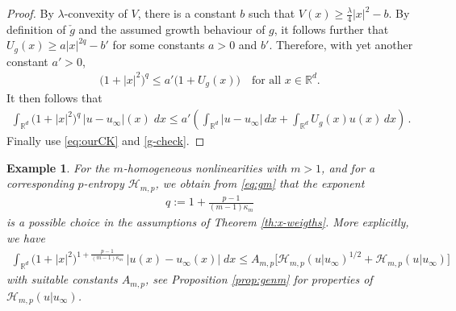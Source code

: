 \documentclass[reqno]{amsart}
\newtheorem{example}[lemma]{Example}
\newcommand{\R}{\mathbb{R}}
\newcommand{\Rd}{{\R^d}}
\newcommand{\uinf}{u_\infty}
\begin{document}
%
\begin{proof}
    By $\lambda$-convexity of $V$, there is a constant $b$ such that $V(x)\ge \frac\lambda4|x|^2-b$. By definition of $\check g$ and the assumed growth behaviour of $g$, it follows further that $U_g(x)\ge a|x|^{2q}-b'$ for some constants $a>0$ and $b'$. Therefore, with yet another constant $a'>0$,
    \begin{align*}
        \big(1+|x|^2\big)^q 
        \le a' \big(1+U_g(x)\big) \quad \text{for all $x\in\Rd$}.
    \end{align*}
    It then follows that
    \begin{align*}
        \int_{\Rd} \big(1+|x|^2)^q \,|u-\uinf|(x)\;dx 
        \le a'\left(\int_{\Rd} |u-u_\infty|\,dx + \int_{\Rd} U_g(x) u(x)\,dx\right)\,.
    \end{align*}
    Finally use \eqref{eq:ourCK} and \eqref{g-check}.
\end{proof}
%
\begin{example}
    For the $m$-homogeneous nonlinearities with $m>1$, and for a corresponding $p$-entropy ${\mathcal H}_{m,p}$, we obtain from \eqref{eq:gm} that the exponent
    \begin{align*}
        q := 1+ \frac{p-1}{(m-1)\kappa_m} 
    \end{align*}
    is a possible choice in the assumptions of Theorem \ref{th:x-weigths}. More explicitly, we have
    \begin{align*}
        \int_{\R^d} \big(1+|x|^2)^{1+\frac{p-1}{(m-1)\kappa_m}} \,|u(x)-\uinf(x)|\;dx \le A_{m,p}\big[\mathcal{H}_{m,p}(u|\uinf)^{1/2}+\mathcal{H}_{m,p}(u|\uinf)\big]
    \end{align*}
    with suitable constants $A_{m,p}$, see  Proposition \ref{prop:genm} for properties of $\mathcal{H}_{m,p}(u|\uinf)$.
\end{example}
\end{document}
